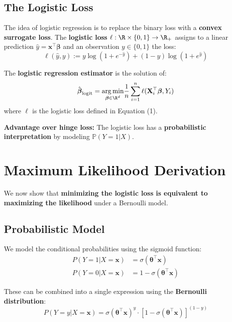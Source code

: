\documentclass[main.tex]{subfiles}
\begin{document}
\subsection{The Logistic Loss}

The idea of logistic regression is to replace the binary loss with a \textbf{convex surrogate loss}. The \textbf{logistic loss} $\ell: \R \times \{0,1\} \to \R_+$ assigns to a linear prediction $\hat{y} = \mathbf{x}^\top \boldsymbol{\beta}$ and an observation $y \in \{0,1\}$ the loss:
$$\ell(\hat{y}, y) := y \log(1 + e^{-\hat{y}}) + (1-y) \log(1 + e^{\hat{y}}) \tag{1}$$

\begin{definition}
The \textbf{logistic regression estimator} is the solution of:
$$\hat{\boldsymbol{\beta}}_{\text{logit}} = \underset{\boldsymbol{\beta} \in \R^d}{\arg\min} \frac{1}{n} \sum_{i=1}^{n} \ell(\mathbf{X}_i^\top \boldsymbol{\beta}, Y_i)$$
where $\ell$ is the logistic loss defined in Equation (1).
\end{definition}

\textbf{Advantage over hinge loss:} The logistic loss has a \textbf{probabilistic interpretation} by modeling $\mathbb{P}(Y = 1 | X)$.

\section{Maximum Likelihood Derivation}

We now show that \textbf{minimizing the logistic loss is equivalent to maximizing the likelihood} under a Bernoulli model.

\subsection{Probabilistic Model}

We model the conditional probabilities using the sigmoid function:
\begin{align}
P(Y = 1 | X = \mathbf{x}) &= \sigma(\boldsymbol{\theta}^\top \mathbf{x}) \\[8pt]
P(Y = 0 | X = \mathbf{x}) &= 1 - \sigma(\boldsymbol{\theta}^\top \mathbf{x})
\end{align}

These can be combined into a single expression using the \textbf{Bernoulli distribution}:
$$P(Y = y | X = \mathbf{x}) = \sigma(\boldsymbol{\theta}^\top \mathbf{x})^y \cdot [1 - \sigma(\boldsymbol{\theta}^\top \mathbf{x})]^{(1-y)}$$
\end{document}
